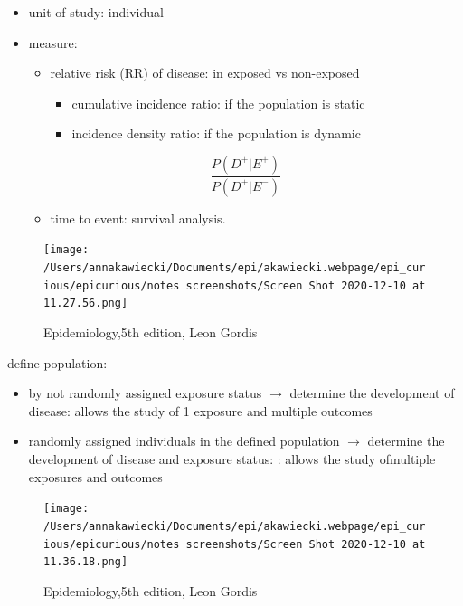 \documentclass[
]{article}
\providecommand{\tightlist}{%
  \setlength{\itemsep}{0pt}\setlength{\parskip}{0pt}}
\begin{document}
\begin{itemize}
\item
  unit of study: individual
\item
  measure:

  \begin{itemize}
  \item
    relative risk (RR) of disease: in exposed vs non-exposed

    \begin{itemize}
    \item
      cumulative incidence ratio: if the population is static
    \item
      incidence density ratio: if the population is dynamic
    \end{itemize}
  \end{itemize}

  \[\frac{P(D^+|E^+)}{P(D^+|E^-)}\]

  \begin{itemize}
  \tightlist
  \item
    time to event: survival analysis.
  \end{itemize}
\end{itemize}

\begin{figure}
\centering
\texttt{[image: /Users/annakawiecki/Documents/epi/akawiecki.webpage/epi\_curious/epicurious/notes screenshots/Screen Shot 2020-12-10 at 11.27.56.png]}
\caption{Epidemiology,5th edition, Leon Gordis}
\end{figure}

define population:

\begin{itemize}
\item
  by not randomly assigned exposure status \(\to\) determine the
  development of disease: allows the study of 1 exposure and multiple
  outcomes
\item
  randomly assigned individuals in the defined population \(\to\)
  determine the development of disease and exposure status: : allows the
  study ofmultiple exposures and outcomes
\end{itemize}

\begin{figure}
\centering
\texttt{[image: /Users/annakawiecki/Documents/epi/akawiecki.webpage/epi\_curious/epicurious/notes screenshots/Screen Shot 2020-12-10 at 11.36.18.png]}
\caption{Epidemiology,5th edition, Leon Gordis}
\end{figure}
\end{document}
